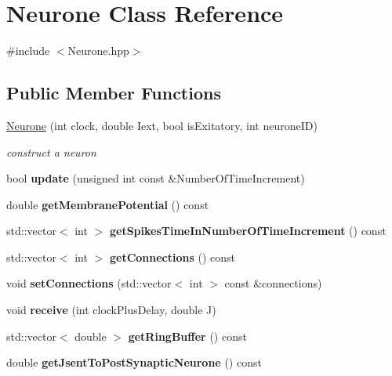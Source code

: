 \hypertarget{classNeurone}{\section{Neurone Class Reference}
\label{classNeurone}
}


{\ttfamily \#include $<$Neurone.\-hpp$>$}

\subsection*{Public Member Functions}
\begin{DoxyCompactItemize}
\item 
\hyperlink{classNeurone_a32dca789543f50744339d5826e210a83}{Neurone} (int clock, double Iext, bool is\-Exitatory, int neurone\-I\-D)
\begin{DoxyCompactList}\small\item\em construct a neuron \end{DoxyCompactList}\item 
\hypertarget{classNeurone_aa6dac345fd1ab43f5aa92034c64abec8}{bool {\bfseries update} (unsigned int const \&Number\-Of\-Time\-Increment)}\label{classNeurone_aa6dac345fd1ab43f5aa92034c64abec8}

\item 
\hypertarget{classNeurone_a47461fff747136e1569184fe5ebcd4c9}{double {\bfseries get\-Membrane\-Potential} () const }\label{classNeurone_a47461fff747136e1569184fe5ebcd4c9}

\item 
\hypertarget{classNeurone_a99d7af7ba00e6ad898330d15b38832db}{std\-::vector$<$ int $>$ {\bfseries get\-Spikes\-Time\-In\-Number\-Of\-Time\-Increment} () const }\label{classNeurone_a99d7af7ba00e6ad898330d15b38832db}

\item 
\hypertarget{classNeurone_a429cd32d2eccf21ef27ee628cb5c1e66}{std\-::vector$<$ int $>$ {\bfseries get\-Connections} () const }\label{classNeurone_a429cd32d2eccf21ef27ee628cb5c1e66}

\item 
\hypertarget{classNeurone_a47e61e44ec11f4f3429f8d4c014c9a91}{void {\bfseries set\-Connections} (std\-::vector$<$ int $>$ const \&connections)}\label{classNeurone_a47e61e44ec11f4f3429f8d4c014c9a91}

\item 
\hypertarget{classNeurone_af514ca0ec50cb282c8431ff17832123c}{void {\bfseries receive} (int clock\-Plus\-Delay, double J)}\label{classNeurone_af514ca0ec50cb282c8431ff17832123c}

\item 
\hypertarget{classNeurone_a2e7773f8f6fef5019e22851fbfada0fb}{std\-::vector$<$ double $>$ {\bfseries get\-Ring\-Buffer} () const }\label{classNeurone_a2e7773f8f6fef5019e22851fbfada0fb}

\item 
\hypertarget{classNeurone_ac7746b1b83936b6e665aee632da0a131}{double {\bfseries get\-Jsent\-To\-Post\-Synaptic\-Neurone} () const }\label{classNeurone_ac7746b1b83936b6e665aee632da0a131}

\end{DoxyCompactItemize}


